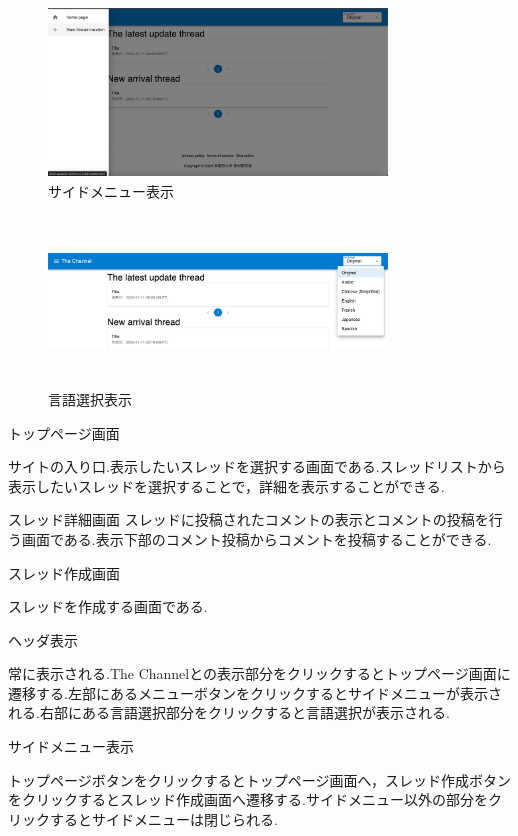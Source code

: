\documentclass[b5paper,12pt,dvipdfmx]{jsreport}
\begin{document}
\begin{figure}[htbp]
	\centering
	\includegraphics[width=90mm,height=45mm]{img/side_menu.png}

	\caption*{サイドメニュー表示}
\end{figure}

\begin{figure}[htbp]
	\centering
	\includegraphics[width=90mm,height=45mm]{./img/select_language.png}

	\caption*{言語選択表示}
\end{figure}

トップページ画面

サイトの入り口.表示したいスレッドを選択する画面である.スレッドリストから表示したいスレッドを選択することで，詳細を表示することができる.

スレッド詳細画面
スレッドに投稿されたコメントの表示とコメントの投稿を行う画面である.表示下部のコメント投稿からコメントを投稿することができる.

スレッド作成画面

スレッドを作成する画面である.

ヘッダ表示

常に表示される.The Channelとの表示部分をクリックするとトップページ画面に遷移する.左部にあるメニューボタンをクリックするとサイドメニューが表示される.右部にある言語選択部分をクリックすると言語選択が表示される.

サイドメニュー表示

トップページボタンをクリックするとトップページ画面へ，スレッド作成ボタンをクリックするとスレッド作成画面へ遷移する.サイドメニュー以外の部分をクリックするとサイドメニューは閉じられる.
\end{document}
